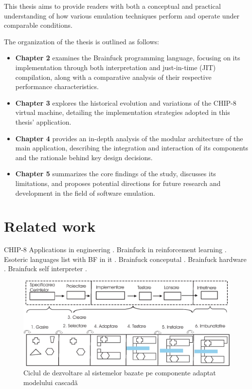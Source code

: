 \par This thesis aims to provide readers with both a conceptual and practical understanding of how various emulation techniques perform and operate under comparable conditions.

\par The organization of the thesis is outlined as follows:

\begin{itemize}
    \item \textbf{Chapter 2} examines the Brainfuck programming language, focusing on its implementation through both interpretation and just-in-time (JIT) compilation, along with a comparative analysis of their respective performance characteristics.
    \item \textbf{Chapter 3} explores the historical evolution and variations of the CHIP-8 virtual machine, detailing the implementation strategies adopted in this thesis' application.
    \item \textbf{Chapter 4} provides an in-depth analysis of the modular architecture of the main application, describing the integration and interaction of its components and the rationale behind key design decisions.
    \item \textbf{Chapter 5} summarizes the core findings of the study, discusses its limitations, and proposes potential directions for future research and development in the field of software emulation.
\end{itemize}

\section{Related work}
\label{chap:ch1sec2}

\par CHIP-8 Applications in engineering \cite{Chip8Applications2019}.
Brainfuck in reinforcement learning \cite{BFReinforcementLearining2022}.
Esoteric languages list with BF in it \cite{BFEsolang2015}.
Brainfuck conceputal \cite{BFConceptual2017}.
Brainfuck hardware \cite{BFHardware2016}.
Brainfuck self interpreter \cite{BFSelfInterpreter2003}.

\begin{figure}[htbp]
	\centering
		\includegraphics[scale=0.65]{./figures/fig_3_1.eps}
	\caption{Ciclul de dezvoltare al sistemelor bazate pe componente adaptat modelului cascadã}
	\label{FigCBSD}
\end{figure}

